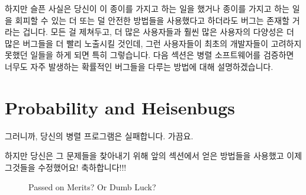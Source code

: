 하지만 슬픈 사실은 당신이 이 종이를 가지고 하는 일을 했거나 종이를 가지고 하는
일을 회피할 수 있는 더 또는 덜 안전한 방법들을 사용했다고 하더라도 버그는
존재할 거라는 겁니다.
모든 걸 제쳐두고, 더 많은 사용자들과 훨씬 많은 사용자의 다양성은 더 많은
버그들을 더 빨리 노출시킬 것인데, 그런 사용자들이 최초의 개발자들이 고려하지
못했던 일들을 하게 되면 특히 그렇습니다.
다음 섹션은 병렬 소프트웨어를 검증하면 너무도 자주 발생하는 확률적인 버그들을
다루는 방법에 대해 설명하겠습니다.

\section{Probability and Heisenbugs}
\label{sec:debugging:Probability and Heisenbugs}

그러니까, 당신의 병렬 프로그램은 실패합니다.
가끔요.

하지만 당신은 그 문제들을 찾아내기 위해 앞의 섹션에서 얻은 방법들을 사용했고
이제 그것들을 수정했어요!
축하합니다!!!

\begin{figure}[tb]
\centering
{}
\caption{Passed on Merits?  Or Dumb Luck?}
\end{figure}


